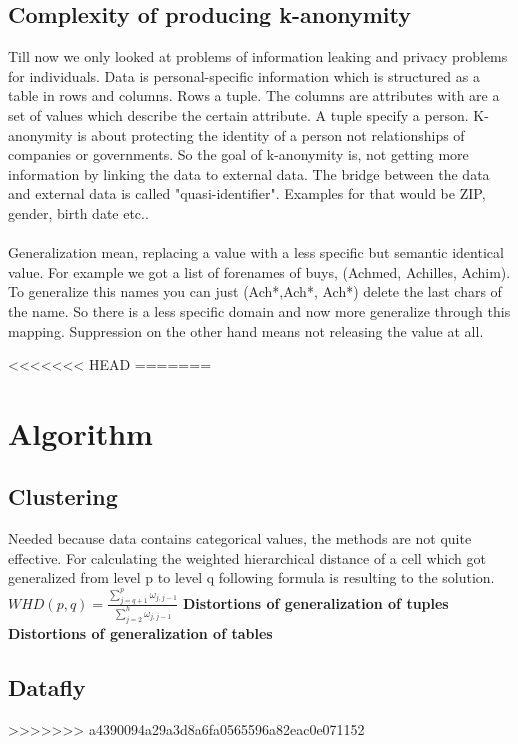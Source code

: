 \documentclass{llncs}
\begin{document}
\subsection{Complexity of producing k-anonymity}
Till now we only looked at problems of information leaking and privacy problems for individuals. Data is personal-specific information which is structured as a table in rows and columns. Rows a tuple. The columns are attributes with are a set of values which describe the certain attribute. A tuple specify a person. K-anonymity is about protecting the identity of a person not relationships of companies or governments. So the goal of k-anonymity is, not getting more information by linking the data to external data. The bridge between the data and external data is called "quasi-identifier". Examples for that would be ZIP, gender, birth date etc.. \\
\\
Generalization mean, replacing a value with a less specific but semantic identical value. For example we got a list of forenames of buys, (Achmed, Achilles, Achim). To generalize this names you can just (Ach*,Ach*, Ach*) delete the last chars of the name. So there is a less specific domain and now more generalize through this mapping. Suppression on the other hand means not releasing the value at all.

<<<<<<< HEAD
=======
\section{Algorithm}
\subsection{Clustering}
Needed because data contains categorical values, the methods are not quite effective.
\cite{li2006achieving}
For calculating the weighted hierarchical distance of a cell which got generalized from level p to level q following formula is resulting to the solution.\\
$ WHD (p, q) = \frac{\sum_{j=q+1}^{p} \omega_{j,j-1}}{\sum_{j=2}^{h} \omega_{j,j-1}} $
\textbf{Distortions of generalization of tuples}
\textbf{Distortions of generalization of tables}


\subsection{Datafly}
>>>>>>> a4390094a29a3d8a6fa0565596a82eac0e071152
\end{document}
